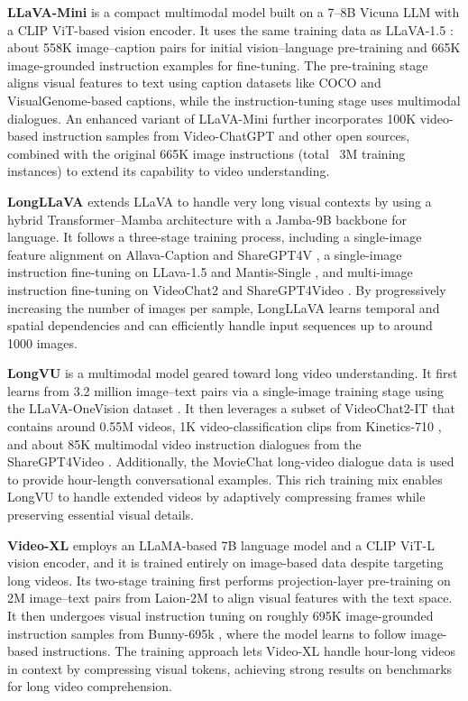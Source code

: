 \noindent\textbf{LLaVA-Mini} \cite{zhang2025llava} is a compact multimodal model built on a 7–8B Vicuna LLM with a CLIP ViT-based vision encoder. It uses the same training data as LLaVA-1.5 \cite{liu2024improved}: about 558K image–caption pairs for initial vision–language pre-training and 665K image-grounded instruction examples for fine-tuning. The pre-training stage aligns visual features to text using caption datasets like COCO \cite{chen2015microsoft} and VisualGenome-based \cite{krishna2017visual} captions, while the instruction-tuning stage uses multimodal dialogues. An enhanced variant of LLaVA-Mini further incorporates 100K video-based instruction samples from Video-ChatGPT \cite{maaz2023video} and other open sources, combined with the original 665K image instructions (total ~3M training instances) to extend its capability to video understanding.

\noindent\textbf{LongLLaVA} \cite{wang2024longllava} extends LLaVA \cite{liu2024improved} to handle very long visual contexts by using a hybrid Transformer–Mamba architecture with a Jamba-9B backbone for language. It follows a three-stage training process, including a single-image feature alignment on Allava-Caption \cite{chen2024allava} and ShareGPT4V \cite{chen2024sharegpt4v}, a single-image instruction fine-tuning on LLava-1.5 and Mantis-Single \cite{jiang2024mantis}, and multi-image instruction fine-tuning on VideoChat2 \cite{li2023videochat} and ShareGPT4Video \cite{chen2025sharegpt4video}. By progressively increasing the number of images per sample, LongLLaVA learns temporal and spatial dependencies and can efficiently handle input sequences up to around 1000 images. 

\noindent\textbf{LongVU} \cite{shen2024longvu} is a multimodal model geared toward long video understanding. It first learns from 3.2 million image–text pairs via a single-image training stage using the LLaVA-OneVision dataset \cite{li2024llavaov}. It then leverages a subset of VideoChat2-IT \cite{li2023videochat} that contains around 0.55M videos, 1K video-classification clips from Kinetics-710 \cite{carreira2019short}, and about 85K multimodal video instruction dialogues from the ShareGPT4Video \cite{chen2025sharegpt4video}.  Additionally, the MovieChat long-video dialogue data \cite{song2024moviechat} is used to provide hour-length conversational examples. This rich training mix enables LongVU to handle extended videos by adaptively compressing frames while preserving essential visual details.

\noindent\textbf{Video-XL} \cite{shu2024video} employs an LLaMA-based 7B language model and a CLIP ViT-L vision encoder, and it is trained entirely on image-based data despite targeting long videos. Its two-stage training first performs projection-layer pre-training on 2M image–text pairs from Laion-2M \cite{schuhmann2021laion} to align visual features with the text space. It then undergoes visual instruction tuning on roughly 695K image-grounded instruction samples from Bunny-695k \cite{he2024efficient}, where the model learns to follow image-based instructions. The training approach lets Video-XL handle hour-long videos in context by compressing visual tokens, achieving strong results on benchmarks for long video comprehension.

